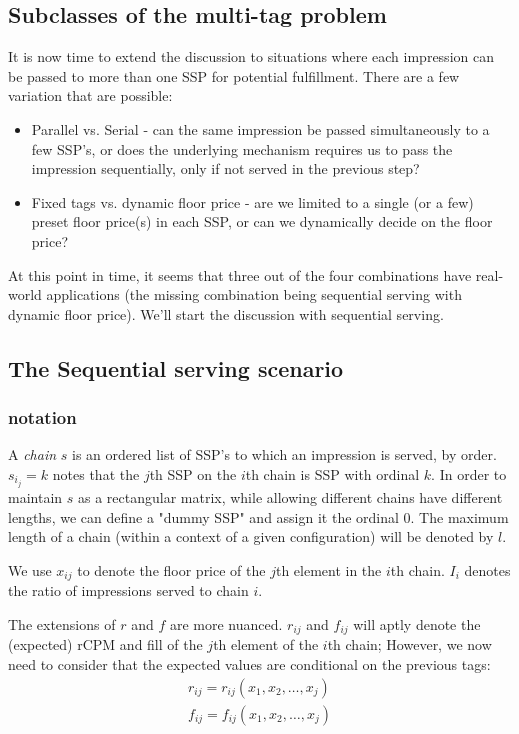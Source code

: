 \documentclass{article}
\begin{document}
\begin{large}
\subsection{Subclasses of the multi-tag problem}
It is now time to extend the discussion to situations where each impression can be passed to more than one SSP for potential fulfillment. There are a few variation that are possible:
\begin{itemize}
\item Parallel vs. Serial - can the same impression be passed simultaneously to a few SSP's, or does the underlying mechanism requires us to pass the impression sequentially, only if not served in the previous step?
\item Fixed tags vs. dynamic floor price - are we limited to a single (or a few) preset floor price(s) in each SSP, or can we dynamically decide on the floor price?
\end{itemize}
At this point in time, it seems that three out of the four combinations have real-world applications (the missing combination being sequential serving with dynamic floor price). We'll start the discussion with sequential serving.

\subsection{The Sequential serving scenario}
\subsubsection{notation}
A \emph{chain} $s$ is an ordered list of SSP's to which an impression is served, by order. $s_i_j=k$ notes that the $j$th SSP on the $i$th chain is SSP with ordinal $k$. In order to maintain $s$ as a rectangular matrix, while allowing different chains  have different lengths, we can define a "dummy SSP" and assign it the ordinal 0. The maximum length of a chain (within a context of a given configuration) will be denoted by $l$. 

We use $x_{ij}$ to denote the floor price of the $j$th element in the $i$th chain. $I_i$ denotes the ratio of impressions served to chain $i$.

The extensions of $r$ and $f$ are more nuanced. $r_{ij}$ and $f_{ij}$ will aptly denote the (expected) rCPM and fill of the $j$th element of the $i$th chain; However, we now need to consider that the expected values are conditional on the previous tags:
\begin{equation*}
\begin{aligned}
r_{ij}=r_{ij}(x_1,x_2,\dots,x_j)\\
f_{ij}=f_{ij}(x_1,x_2,\dots,x_j)
\end{aligned}
\end{equation*}


\end{large}
\end{document}

